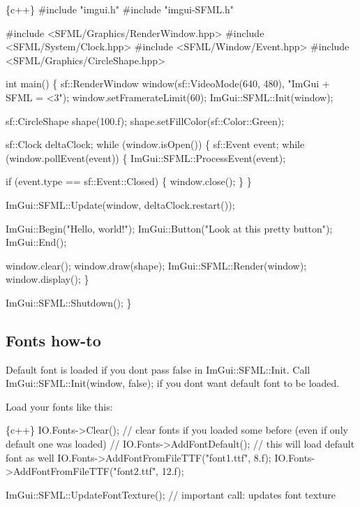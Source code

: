 \begin{DoxyCode}
\{c++\}
#include "imgui.h"
#include "imgui-SFML.h"

#include <SFML/Graphics/RenderWindow.hpp>
#include <SFML/System/Clock.hpp>
#include <SFML/Window/Event.hpp>
#include <SFML/Graphics/CircleShape.hpp>

int main()
\{
    sf::RenderWindow window(sf::VideoMode(640, 480), "ImGui + SFML = <3");
    window.setFramerateLimit(60);
    ImGui::SFML::Init(window);

    sf::CircleShape shape(100.f);
    shape.setFillColor(sf::Color::Green);

    sf::Clock deltaClock;
    while (window.isOpen()) \{
        sf::Event event;
        while (window.pollEvent(event)) \{
            ImGui::SFML::ProcessEvent(event);

            if (event.type == sf::Event::Closed) \{
                window.close();
            \}
        \}

        ImGui::SFML::Update(window, deltaClock.restart());

        ImGui::Begin("Hello, world!");
        ImGui::Button("Look at this pretty button");
        ImGui::End();

        window.clear();
        window.draw(shape);
        ImGui::SFML::Render(window);
        window.display();
    \}

    ImGui::SFML::Shutdown();
\}
\end{DoxyCode}


\subsection*{Fonts how-\/to }

Default font is loaded if you don\textquotesingle{}t pass false in {\ttfamily Im\+Gui\+::\+S\+F\+M\+L\+::\+Init}. Call {\ttfamily Im\+Gui\+::\+S\+F\+M\+L\+::\+Init(window, false);} if you don\textquotesingle{}t want default font to be loaded.


\begin{DoxyItemize}
\item Load your fonts like this\+:
\end{DoxyItemize}


\begin{DoxyCode}
\{c++\}
IO.Fonts->Clear(); // clear fonts if you loaded some before (even if only default one was loaded)
// IO.Fonts->AddFontDefault(); // this will load default font as well
IO.Fonts->AddFontFromFileTTF("font1.ttf", 8.f);
IO.Fonts->AddFontFromFileTTF("font2.ttf", 12.f);

ImGui::SFML::UpdateFontTexture(); // important call: updates font texture
\end{DoxyCode}



